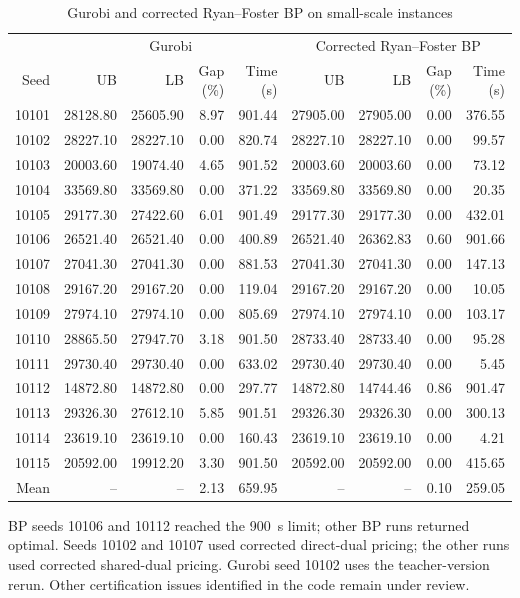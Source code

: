 \begin{table}[htbp]
\centering\small
\setlength{\tabcolsep}{3pt}
\caption{Gurobi and corrected Ryan--Foster BP on small-scale instances}
\label{tab:small-corrected-bp}
\begin{tabular}{r*{8}{r}}
\toprule
 & \multicolumn{4}{c}{Gurobi} & \multicolumn{4}{c}{Corrected Ryan--Foster BP} \\
\cmidrule(lr){2-5}\cmidrule(lr){6-9}
Seed & UB & LB & Gap (\%) & Time (s) & UB & LB & Gap (\%) & Time (s) \\
\midrule
10101 & 28128.80 & 25605.90 & 8.97 & 901.44 & 27905.00 & 27905.00 & 0.00 & 376.55 \\
10102 & 28227.10 & 28227.10 & 0.00 & 820.74 & 28227.10 & 28227.10 & 0.00 & 99.57 \\
10103 & 20003.60 & 19074.40 & 4.65 & 901.52 & 20003.60 & 20003.60 & 0.00 & 73.12 \\
10104 & 33569.80 & 33569.80 & 0.00 & 371.22 & 33569.80 & 33569.80 & 0.00 & 20.35 \\
10105 & 29177.30 & 27422.60 & 6.01 & 901.49 & 29177.30 & 29177.30 & 0.00 & 432.01 \\
10106 & 26521.40 & 26521.40 & 0.00 & 400.89 & 26521.40 & 26362.83 & 0.60 & 901.66 \\
10107 & 27041.30 & 27041.30 & 0.00 & 881.53 & 27041.30 & 27041.30 & 0.00 & 147.13 \\
10108 & 29167.20 & 29167.20 & 0.00 & 119.04 & 29167.20 & 29167.20 & 0.00 & 10.05 \\
10109 & 27974.10 & 27974.10 & 0.00 & 805.69 & 27974.10 & 27974.10 & 0.00 & 103.17 \\
10110 & 28865.50 & 27947.70 & 3.18 & 901.50 & 28733.40 & 28733.40 & 0.00 & 95.28 \\
10111 & 29730.40 & 29730.40 & 0.00 & 633.02 & 29730.40 & 29730.40 & 0.00 & 5.45 \\
10112 & 14872.80 & 14872.80 & 0.00 & 297.77 & 14872.80 & 14744.46 & 0.86 & 901.47 \\
10113 & 29326.30 & 27612.10 & 5.85 & 901.51 & 29326.30 & 29326.30 & 0.00 & 300.13 \\
10114 & 23619.10 & 23619.10 & 0.00 & 160.43 & 23619.10 & 23619.10 & 0.00 & 4.21 \\
10115 & 20592.00 & 19912.20 & 3.30 & 901.50 & 20592.00 & 20592.00 & 0.00 & 415.65 \\
\midrule
Mean & -- & -- & 2.13 & 659.95 & -- & -- & 0.10 & 259.05 \\
\bottomrule
\end{tabular}
\par\smallskip
{\footnotesize BP seeds 10106 and 10112 reached the 900~s limit; other BP runs returned optimal. Seeds 10102 and 10107 used corrected direct-dual pricing; the other runs used corrected shared-dual pricing. Gurobi seed 10102 uses the teacher-version rerun. Other certification issues identified in the code remain under review.\par}
\end{table}